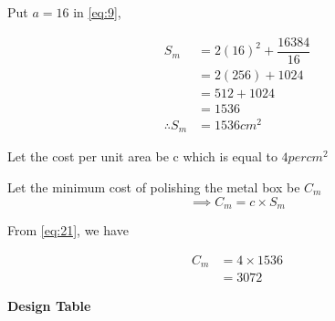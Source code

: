\documentclass[journal,12pt,twocolumn]{IEEEtran}
\begin{document}
	 
	 
	  Put $a = 16$ in \eqref{eq:9},
	  
	\begin{align}
	S_m &= 2(16)^2 + \dfrac{16384}{16}\\
	 &= 2(256) + 1024\\
	&= 512 + 1024\\
	&= 1536\\
	 \label{eq:21}\therefore S_m &= 1536 cm^2
	 \end{align}
	 
	 Let the cost per unit area be c which is equal to \rupee$4 per cm{^2}$
	 
	  Let the minimum cost of polishing the metal box be $C_m$
	  \begin{equation}
	  \implies C_m = c \times S_m
	  \end{equation}
	  
	 From \eqref{eq:21}, we have
	 
	  \begin{align} C_m &= 4\times1536\\
	   &=3072
	   \end{align}
	   \begin{table}[h] 
\caption{\textbf{Design Table}}
\label{Table}

\end{table}
	   
\end{document}
